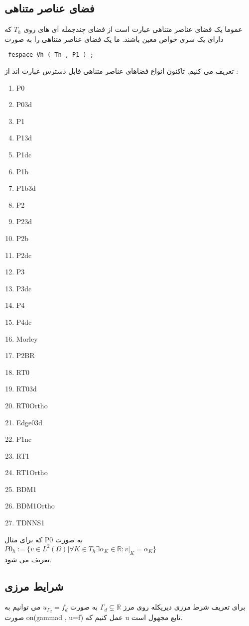\subsection{فضای عناصر متناهی}
عموما یک فضای عناصر متناهی عبارت است از فضای چندجمله ای های روی $T_{h}$ که دارای یک سری خواص معین باشند. ما یک فضای عناصر متناهی را به صورت 
\begin{LTR}
	\begin{lstlisting}
 fespace Vh ( Th , P1 ) ;
	\end{lstlisting}
\end{LTR}
تعریف می کنیم. تاکنون انواع فضاهای عناصر متناهی قابل دسترس عبارت اند از :
\begin{enumerate}
	\item P0
	\item  P03d
	\item  P1
	\item  P13d
	\item  P1dc
	\item  P1b
	\item  P1b3d
	\item  P2
	\item  P23d
	\item  P2b
	\item  P2dc
	\item  P3
	\item  P3dc
	\item  P4
	\item  P4dc
	\item  Morley
	\item  P2BR
	\item  RT0
	\item  RT03d
	\item  RT0Ortho
	\item  Edge03d
	\item  P1nc
	\item  RT1
	\item  RT1Ortho
	\item  BDM1
	\item  BDM1Ortho
	\item  TDNNS1
\end{enumerate}
که برای مثال P0 به صورت\\
$P0_{h} := \{ v \in L^{2}(\Omega) | \forall K \in T_{h} \exists \alpha_{K} \in \mathbb{R} : v|_{K} = \alpha_{K} \}$\\
تعریف می شود.
\subsection{شرایط مرزی}
برای تعریف شرط مرزی دیریکله روی مرز $ \Gamma_{d}  \subsetneq \mathbb{R} $ به صورت $u_{\Gamma_{d}} = f_{d}$ می توانیم به صورت on(gammad , u=f) عمل کنیم که u تابع مجهول است.
